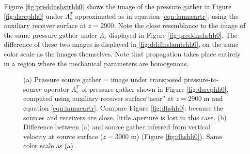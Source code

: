\documentclass[12pt]{geophysics}
\begin{document}
Figure \ref{fig:preddnshstrhh0} shows the image of the pressure gather
in Figure \ref{fig:dsrcphh0} under $\Lambda_s^T$ approximated as in
equation \ref{eqn:lamneartr},
using the auxiliary receiver surface at $z=2900$. Note
the close resemblance to the image of the same pressure gather under
$\Lambda_s$ displayed in Figure
\ref{fig:preddnshshh0}. The difference of these two images is
displayed in \ref{fig:ddiffnslamtrhh0}, on the same color scale as the
images themselves. Note that propagation takes place entirely in a
region where the mechanical parameters are homogenous.

\begin{figure}
  \centering
  \caption{(a) Pressure source gather = image
  under transposed pressure-to-source operator $\Lambda_s^T$ of pressure gather
  shown in Figure \ref{fig:dsrcphh0}, computed using
  auxiliary receiver surface``near''  at $z=2900$ m and equation \ref{eqn:lamneartr}. Compare Figure
  \ref{fig:dhshh0}: because the sources and
  receivers are close, little aperture is lost in this case. (b) Difference between (a) 
  and source gather inferred from vertical velocity at source
  surface ($z=3000$ m) (Figure \ref{fig:dhshh0}). Same color scale as (a).}
\end{figure}
\end{document}
